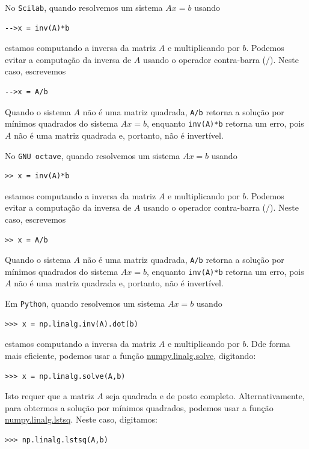 \ifisscilab
\begin{obs}
  No \verb+Scilab+, quando resolvemos um sistema $Ax = b$ usando
\begin{verbatim}
-->x = inv(A)*b
\end{verbatim}
estamos computando a inversa da matriz $A$ e multiplicando por $b$. Podemos evitar a computação da inversa de $A$ usando o operador contra-barra ($/$). Neste caso, escrevemos
\begin{verbatim}
-->x = A/b
\end{verbatim}
Quando o sistema $A$ não é uma matriz quadrada, \verb+A/b+ retorna a solução por mínimos quadrados do sistema $Ax = b$, enquanto \verb+inv(A)*b+ retorna um erro, pois $A$ não é uma matriz quadrada e, portanto, não é invertível.
\end{obs}
\fi
\ifisoctave
\begin{obs}
  No \verb+GNU octave+, quando resolvemos um sistema $Ax = b$ usando
\begin{verbatim}
>> x = inv(A)*b
\end{verbatim}
estamos computando a inversa da matriz $A$ e multiplicando por $b$. Podemos evitar a computação da inversa de $A$ usando o operador contra-barra ($/$). Neste caso, escrevemos
\begin{verbatim}
>> x = A/b
\end{verbatim}
Quando o sistema $A$ não é uma matriz quadrada, \verb+A/b+ retorna a solução por mínimos quadrados do sistema $Ax = b$, enquanto \verb+inv(A)*b+ retorna um erro, pois $A$ não é uma matriz quadrada e, portanto, não é invertível.
\end{obs}
\fi
\ifispython
\begin{obs}
  Em \verb+Python+, quando resolvemos um sistema $Ax = b$ usando
\begin{verbatim}
>>> x = np.linalg.inv(A).dot(b)
\end{verbatim}
estamos computando a inversa da matriz $A$ e multiplicando por $b$. Dde forma mais eficiente, podemos usar a função \href{https://docs.scipy.org/doc/numpy/reference/generated/numpy.linalg.solve.html}{numpy.linalg.solve}, digitando:
\begin{verbatim}
>>> x = np.linalg.solve(A,b)
\end{verbatim}
Isto requer que a matriz $A$ seja quadrada e de posto completo. Alternativamente, para obtermos a solução por mínimos quadrados, podemos usar a função \href{https://docs.scipy.org/doc/numpy/reference/generated/numpy.linalg.lstsq.html}{numpy.linalg.lstsq}. Neste caso, digitamos:
\begin{verbatim}
>>> np.linalg.lstsq(A,b)
\end{verbatim}
\end{obs}
\fi

